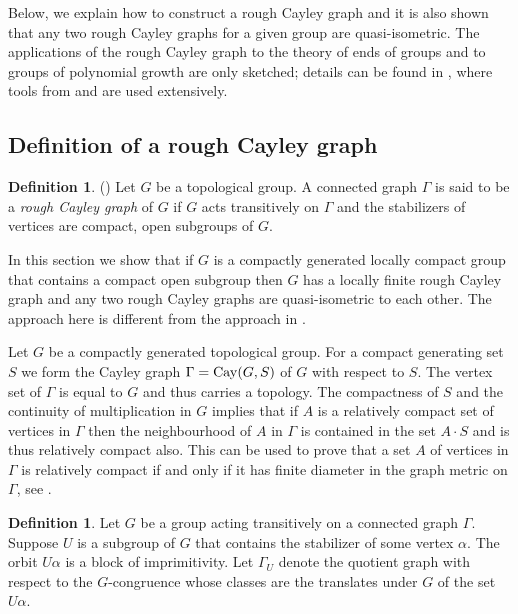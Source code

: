 \documentclass{emsprocart}
\theoremstyle{definition}
\newtheorem{definition}[theorem]{Definition}
\begin{document}
Below, we explain how to construct a rough Cayley graph and 
it is also shown that any two rough Cayley graphs for a given group
are quasi-isometric.
The applications of the rough Cayley graph to the theory of ends 
of groups and to groups of polynomial growth are only sketched; 
details can be found in \cite{KronMoller2008}, 
where tools from \cite{Dunwoody1982} and \cite{DicksDunwoody1989} are 
used extensively.

\subsection{Definition of a rough Cayley graph}
\label{SDefRough}
\begin{definition}{\rm (\cite[Definition~2.1]{KronMoller2008})}
Let $G$ be a topological group.  A connected graph $\Gamma$ is said to be a
{\em rough Cayley graph} of $G$ if $G$ acts transitively on $\Gamma$ and
the stabilizers of vertices are compact, open subgroups of $G$.
\end{definition}

In this section we show that if $G$ is a compactly
generated locally compact group that contains a compact open subgroup
then $G$ has a locally finite rough Cayley graph and any two rough
Cayley graphs are
quasi-isometric to each other.  The approach here is different from
the approach in \cite{KronMoller2008}.

Let $G$ be a compactly generated topological group.  For a compact
generating set $S$ we form the Cayley graph   $\Gamma={\mbox{${\rm Cay}$}}(G, S)$ of $G$ with
respect to $S$.  The vertex set of $\Gamma$ is equal to $G$ and thus
carries a topology.  The compactness of $S$ and the continuity of
multiplication in $G$ implies that if $A$ is a relatively compact set
of vertices in $\Gamma$ then the neighbourhood of $A$ in $\Gamma$ is
contained in the set $A\cdot S$ and is thus relatively compact also.
This can be  used 
to prove that a set $A$ of vertices in $\Gamma$ is relatively compact
if and only if it has finite diameter in the graph metric on $\Gamma$,
see \cite[2.3 Heine-Borel-Eigenschaft]{Abels1974}.

\begin{definition}  \label{Dorbit}
Let $G$ be a group acting transitively on a connected
  graph $\Gamma$.  Suppose $U$ is a subgroup of $G$ that contains the
  stabilizer of some vertex $\alpha$.  The orbit $U\alpha$ is a block
  of imprimitivity.  Let $\Gamma_U$ denote the quotient graph
  with respect to the $G$-congruence whose classes are the translates
  under $G$ of the set $U\alpha$.
\end{definition}
\end{document}
